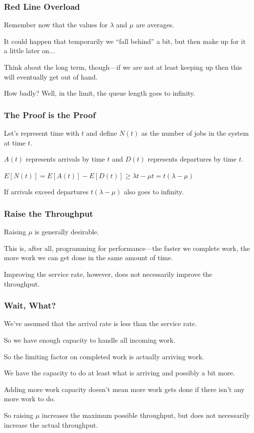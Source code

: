 \begin{frame}
\frametitle{Red Line Overload}

Remember now that the values for $\lambda$ and $\mu$ are averages. 

It could happen that temporarily we ``fall behind'' a bit, but then make up for it a little later on... 

Think about the long term, though---if we are not at least keeping up then this will eventually get out of hand. 

How badly? Well, in the limit, the queue length goes to infinity.

\end{frame}



\begin{frame}
\frametitle{The Proof is the Proof}

Let's represent time with $t$ and define $N(t)$ as the number of jobs in the system at time $t$.

$A(t)$ represents arrivals by time $t$ and $D(t)$ represents departures by time $t$.

\begin{center}
	$E[N(t)] = E[A(t)] - E[D(t)] \geq \lambda t - \mu t = t (\lambda - \mu) $
\end{center}

If arrivals exceed departures  $t (\lambda - \mu) $ also goes to infinity.

\end{frame}



\begin{frame}
\frametitle{Raise the Throughput}

Raising $\mu$ is generally desirable. 

This is, after all, programming for performance---the faster we complete work, the more work we can get done in the same amount of time. 

Improving the service rate, however, does not necessarily improve the throughput. 

\end{frame}



\begin{frame}
\frametitle{Wait, What?}

We've assumed that the arrival rate is less than the service rate. 

So we have enough capacity to handle all incoming work. 

So the limiting factor on completed work is actually arriving work. 

We have the capacity to do at least what is arriving and possibly a bit more. 

Adding more work capacity doesn't mean more work gets done if there isn't any more work to do.

So raising $\mu$ increases the maximum possible throughput, but does not necessarily increase the actual throughput.

\end{frame}



